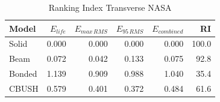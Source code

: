 \begin{table}[H]
    \centering
    \caption{Ranking Index Transverse NASA}
    \label{tab:RI_table_HorizontalNasa}
    \begin{tabular}{lrrrrr}
        \toprule
        \textbf{Model}  & \textbf{$E_{life}$} & \textbf{$E_{max\, RMS}$} & \textbf{$E_{95\, RMS}$} & \textbf{$E_{combined}$} & \textbf{RI} \\
        \midrule
        Solid  & 0.000 & 0.000 & 0.000 & 0.000 & 100.0 \\
        Beam  & 0.072 & 0.042 & 0.133 & 0.075 & 92.8 \\
        Bonded  & 1.139 & 0.909 & 0.988 & 1.040 & 35.4 \\
        CBUSH  & 0.579 & 0.401 & 0.372 & 0.484 & 61.6 \\
        \bottomrule
    \end{tabular}
\end{table}
